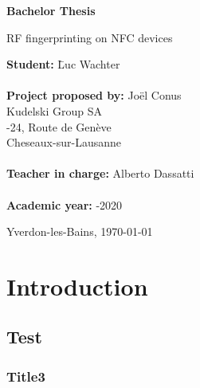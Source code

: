 \documentclass[paper=a4, fontsize=11pt]{scrartcl}
\begin{document}
\begin{titlepage}
  \thispagestyle{firstpage}
  \begin{center}
    \vspace*{5cm}

    \Huge
    \textbf{Bachelor Thesis}

    \vspace{1.5cm}
    \LARGE
    RF fingerprinting on NFC devices
  \end{center}

  \vspace{6cm}
  \begin{tabbing}
    \linespread{3}\textbf{Student:} \hspace{12em} \= Luc Wachter\\\\

    \textbf{Project proposed by:} \> Joël Conus\\
    \> Kudelski Group SA\\
    -24, Route de Genève\\
     Cheseaux-sur-Lausanne\\\\

    \textbf{Teacher in charge:} \> Alberto Dassatti\\\\

    \textbf{Academic year:} -2020
  \end{tabbing}

  \vspace{3cm}
  \begin{flushright}
    Yverdon-les-Bains, \today
  \end{flushright}
\end{titlepage}

\newpage
\renewcommand{\contentsname}{Table of contents}
\tableofcontents

\newpage
\section{Introduction}
\subsection{Test}
\subsubsection{Title3}
\end{document}
